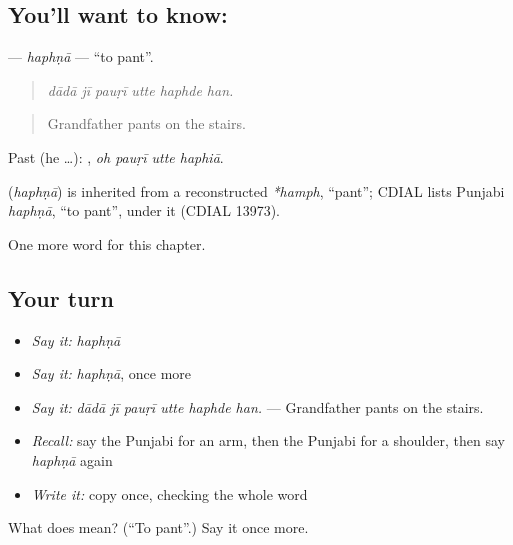 \subsection*{You'll want to know: }
\textbf{} — \emph{haphṇā} — \textquotedblleft{}to pant\textquotedblright{}.

\begin{quote}
     
\end{quote}

\begin{quote}
\emph{dādā jī pauṛī utte haphde han.}
\end{quote}

\begin{quote}
Grandfather pants on the stairs.
\end{quote}

Past (he …):    , \emph{oh pauṛī utte haphiā}.

\begin{cousinweb}
\textbf{} (\emph{haphṇā}) is inherited from a reconstructed \emph{*hamph}, \textquotedblleft{}pant\textquotedblright{}; CDIAL lists Punjabi \emph{haphṇā}, \textquotedblleft{}to pant\textquotedblright{}, under it (CDIAL 13973).
\end{cousinweb}

\begin{grammarlens}[title={What you've built}]
One more word for this chapter.
\end{grammarlens}

\subsection*{Your turn}
\begin{itemize}
\raggedright
  \item \emph{Say it:} \emph{haphṇā}
  \item \emph{Say it:} \emph{haphṇā}, once more
  \item \emph{Say it:} \emph{dādā jī pauṛī utte haphde han.} — Grandfather pants on the stairs.
  \item \emph{Recall:} say the Punjabi for an arm, then the Punjabi for a shoulder, then say \emph{haphṇā} again
  \item \emph{Write it:} copy \textbf{} once, checking the whole word
\end{itemize}

\begin{tcolorbox}[breakable,colback=teal!4,colframe=teal!35!black,title={Before you move on}]
What does  mean? (\textquotedblleft{}To pant\textquotedblright{}.) Say it once more.
\end{tcolorbox}
